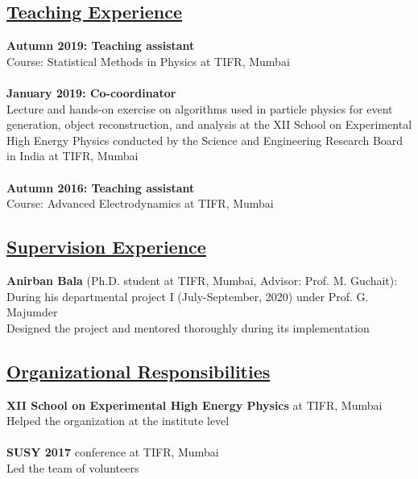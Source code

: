 \documentclass[a4paper,11pt]{article}
\begin{document}
\subsection*{\underline{Teaching Experience}}

\textbf{Autumn 2019: Teaching assistant}\\
Course: Statistical Methods in Physics at TIFR, Mumbai \\
\\
\textbf{January 2019: Co-coordinator}\\
Lecture and hands-on exercise on algorithms used in particle physics for event generation, object reconstruction, and analysis
at the XII School on Experimental High Energy Physics conducted by the Science and Engineering Research Board in India at TIFR, Mumbai \\
\\
\textbf{Autumn 2016: Teaching assistant}\\
Course: Advanced Electrodynamics at TIFR, Mumbai\\

\subsection*{\underline{Supervision Experience}}

\textbf{Anirban Bala} (Ph.D. student at TIFR, Mumbai, Advisor: Prof. M. Guchait):\\
During his departmental project I (July-September, 2020) under Prof. G. Majumder \\
Designed the project and mentored thoroughly during its implementation\\

\subsection*{\underline{Organizational Responsibilities}}

\textbf{XII School on Experimental High Energy Physics} at TIFR, Mumbai\\
Helped the organization at the institute level\\
\\
\textbf{SUSY 2017} conference at TIFR, Mumbai\\
Led the team of volunteers \\
\end{document}
